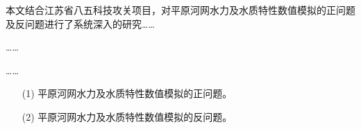 \begin{preface}
	本文结合江苏省八五科技攻关项目，对平原河网水力及水质特性数值模拟的正问题及反问题进行了系统深入的研究……\par
	……\par
	……\par		
\begin{enumerate}
	\item[(1)] 平原河网水力及水质特性数值模拟的正问题。
	\item[(2)] 平原河网水力及水质特性数值模拟的反问题。
\end{enumerate}
	
\end{preface}